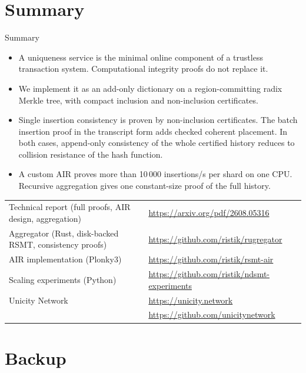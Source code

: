 \documentclass[aspectratio=169,10pt]{beamer}
\begin{document}
\section{Summary}

\begin{frame}{Summary}
\small
\begin{itemize}
  \item A uniqueness service is the minimal online component of a trustless transaction system. Computational integrity proofs do not replace it.
  \item We implement it as an add-only dictionary on a region-committing radix Merkle tree, with compact inclusion and non-inclusion certificates.
  \item Single insertion consistency is proven by non-inclusion certificates. The batch insertion proof in the transcript form adds checked coherent placement. In both cases, append-only consistency of the whole certified history reduces to collision resistance of the hash function.
  \item A custom AIR proves more than 10\,000 insertions/s per shard on one CPU. Recursive aggregation gives one constant-size proof of the full history.
\end{itemize}

\vspace{2mm}
\footnotesize
\begin{tabular}{@{}ll@{}}
\toprule
Technical report (full proofs, AIR design, aggregation) & \url{https://arxiv.org/pdf/2608.05316} \\
Aggregator (Rust, disk-backed RSMT, consistency proofs) & \url{https://github.com/ristik/rugregator} \\
AIR implementation (Plonky3) & \url{https://github.com/ristik/rsmt-air} \\
Scaling experiments (Python) & \url{https://github.com/ristik/ndsmt-experiments} \\
Unicity Network & \url{https://unicity.network} \\
 & \url{https://github.com/unicitynetwork} \\
\bottomrule
\end{tabular}
\end{frame}

\appendix
\section*{Backup}
\end{document}
